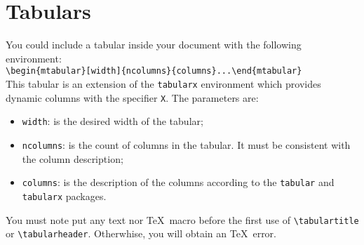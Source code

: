 \documentclass[book]{upmethodology-document}
\begin{document}
\section{Tabulars}

You could include a tabular inside your document with the following environment: \\
\texttt{{\textbackslash}begin\{mtabular\}[width]\{ncolumns\}\{columns\}...{\textbackslash}end\{mtabular\}} \\

This tabular is an extension of the \texttt{tabularx} environment which provides dynamic columns with the specifier \texttt{X}. The parameters are:
\begin{itemize}
\item \texttt{width}: is the desired width of the tabular;

\item \texttt{ncolumns}: is the count of columns in the tabular. It must be consistent with the column description;

\item \texttt{columns}: is the description of the columns according to the \texttt{tabular} and \texttt{tabularx} packages.

\end{itemize}


\begin{upmcaution}
	You must note put any text nor \TeX\ macro before the first use of \texttt{{\textbackslash}tabulartitle} or \texttt{{\textbackslash}tabularheader}. Otherwhise, you will obtain an \TeX\ error.
\end{upmcaution}
\end{document}
